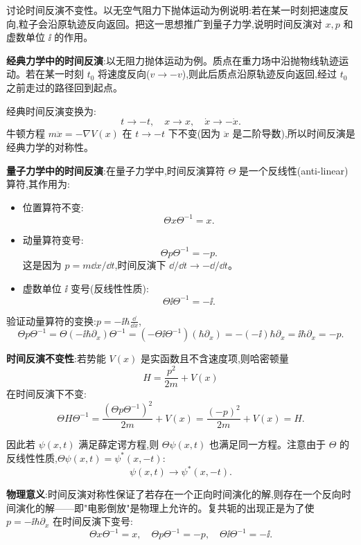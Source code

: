 \begin{question}
讨论时间反演不变性。以无空气阻力下抛体运动为例说明:若在某一时刻把速度反向,粒子会沿原轨迹反向返回。把这一思想推广到量子力学,说明时间反演对 $x,p$ 和虚数单位 $\ii$ 的作用。
\begin{solution}
	\textbf{经典力学中的时间反演}:以无阻力抛体运动为例。质点在重力场中沿抛物线轨迹运动。若在某一时刻 $t_0$ 将速度反向($v\to -v$),则此后质点沿原轨迹反向返回,经过 $t_0$ 之前走过的路径回到起点。

	经典时间反演变换为:
	\[
	t \to -t,\quad x \to x,\quad \dot x \to -\dot x.
	\]
	牛顿方程 $m\ddot x = -\nabla V(x)$ 在 $t\to -t$ 下不变(因为 $\ddot x$ 是二阶导数),所以时间反演是经典力学的对称性。

	\textbf{量子力学中的时间反演}:在量子力学中,时间反演算符 $\Theta$ 是一个反线性(anti-linear)算符,其作用为:
	\begin{itemize}
	\item 位置算符不变:
	\[
	\Theta x\Theta^{-1} = x.
	\]
	\item 动量算符变号:
	\[
	\Theta p\Theta^{-1} = -p.
	\]
	这是因为 $p=m\dd x/\dd t$,时间反演下 $\dd/\dd t \to -\dd/\dd t$。
	\item 虚数单位 $\ii$ 变号(反线性性质):
	\[
	\Theta \ii\Theta^{-1} = -\ii.
	\]
	\end{itemize}

	验证动量算符的变换:$p = -\ii\hbar\frac{\dd}{\dd x}$,
	\[
	\Theta p \Theta^{-1} = \Theta(-\ii\hbar\partial_x)\Theta^{-1}
	= (-\Theta\ii\Theta^{-1})(\hbar\partial_x) = -(-\ii)\hbar\partial_x = \ii\hbar\partial_x = -p.
	\]

	\textbf{时间反演不变性}:若势能 $V(x)$ 是实函数且不含速度项,则哈密顿量
	\[
	H = \frac{p^2}{2m} + V(x)
	\]
	在时间反演下不变:
	\[
	\Theta H \Theta^{-1} = \frac{(\Theta p\Theta^{-1})^2}{2m} + V(x)
	= \frac{(-p)^2}{2m} + V(x) = H.
	\]

	因此若 $\psi(x,t)$ 满足薛定谔方程,则 $\Theta\psi(x,t)$ 也满足同一方程。注意由于 $\Theta$ 的反线性性质,$\Theta\psi(x,t) = \psi^*(x,-t)$:
	\[
	\psi(x,t) \to \psi^*(x,-t).
	\]

	\textbf{物理意义}:时间反演对称性保证了若存在一个正向时间演化的解,则存在一个反向时间演化的解——即"电影倒放"是物理上允许的。复共轭的出现正是为了使 $p=-\ii\hbar\partial_x$ 在时间反演下变号:
	\[
	\boxed{\Theta x\Theta^{-1}=x,\quad \Theta p\Theta^{-1}=-p,\quad \Theta\ii\Theta^{-1}=-\ii}.
	\]
	\end{solution}
\end{question}

